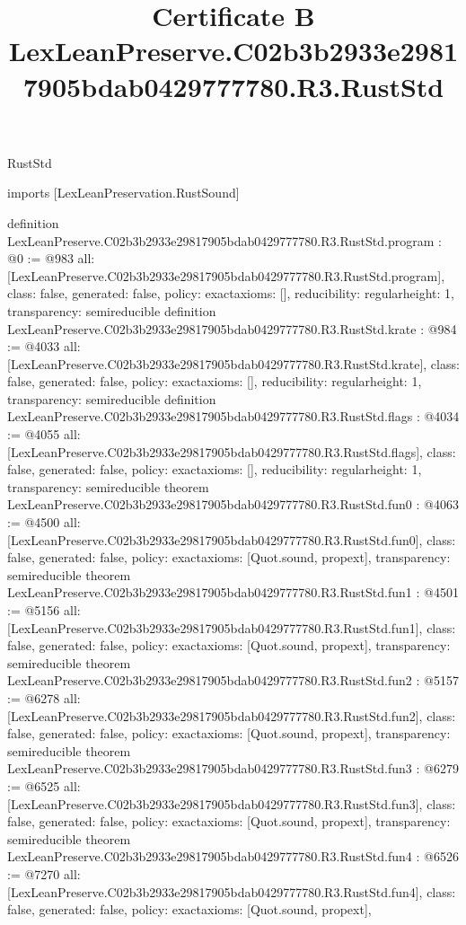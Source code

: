 \begin{lexlean}{RustStd}
\title{Certificate B LexLeanPreserve.C02b3b2933e29817905bdab0429777780.R3.RustStd}
\begin{coremodule}
imports [LexLeanPreservation.RustSound]

definition LexLeanPreserve.C02b3b2933e29817905bdab0429777780.R3.RustStd.program : @0 := @983 {
  all: [LexLeanPreserve.C02b3b2933e29817905bdab0429777780.R3.RustStd.program],
  class: false,
  generated: false,
  policy: exact{axioms: []},
  reducibility: regular{height: 1},
  transparency: semireducible
}
definition LexLeanPreserve.C02b3b2933e29817905bdab0429777780.R3.RustStd.krate : @984 := @4033 {
  all: [LexLeanPreserve.C02b3b2933e29817905bdab0429777780.R3.RustStd.krate],
  class: false,
  generated: false,
  policy: exact{axioms: []},
  reducibility: regular{height: 1},
  transparency: semireducible
}
definition LexLeanPreserve.C02b3b2933e29817905bdab0429777780.R3.RustStd.flags : @4034 := @4055 {
  all: [LexLeanPreserve.C02b3b2933e29817905bdab0429777780.R3.RustStd.flags],
  class: false,
  generated: false,
  policy: exact{axioms: []},
  reducibility: regular{height: 1},
  transparency: semireducible
}
theorem LexLeanPreserve.C02b3b2933e29817905bdab0429777780.R3.RustStd.fun0 : @4063 := @4500 {
  all: [LexLeanPreserve.C02b3b2933e29817905bdab0429777780.R3.RustStd.fun0],
  class: false,
  generated: false,
  policy: exact{axioms: [Quot.sound, propext]},
  transparency: semireducible
}
theorem LexLeanPreserve.C02b3b2933e29817905bdab0429777780.R3.RustStd.fun1 : @4501 := @5156 {
  all: [LexLeanPreserve.C02b3b2933e29817905bdab0429777780.R3.RustStd.fun1],
  class: false,
  generated: false,
  policy: exact{axioms: [Quot.sound, propext]},
  transparency: semireducible
}
theorem LexLeanPreserve.C02b3b2933e29817905bdab0429777780.R3.RustStd.fun2 : @5157 := @6278 {
  all: [LexLeanPreserve.C02b3b2933e29817905bdab0429777780.R3.RustStd.fun2],
  class: false,
  generated: false,
  policy: exact{axioms: [Quot.sound, propext]},
  transparency: semireducible
}
theorem LexLeanPreserve.C02b3b2933e29817905bdab0429777780.R3.RustStd.fun3 : @6279 := @6525 {
  all: [LexLeanPreserve.C02b3b2933e29817905bdab0429777780.R3.RustStd.fun3],
  class: false,
  generated: false,
  policy: exact{axioms: [Quot.sound, propext]},
  transparency: semireducible
}
theorem LexLeanPreserve.C02b3b2933e29817905bdab0429777780.R3.RustStd.fun4 : @6526 := @7270 {
  all: [LexLeanPreserve.C02b3b2933e29817905bdab0429777780.R3.RustStd.fun4],
  class: false,
  generated: false,
  policy: exact{axioms: [Quot.sound, propext]},
}
\end{coremodule}
\end{lexlean}
